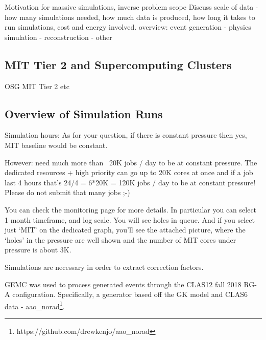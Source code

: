 Motivation for massive simulations, inverse problem scope
    Discuss scale of data - how many simulations needed, how much data is produced, how long it takes to run simulations, cost and energy involved.
    overview: event generation - physics simulation - reconstruction - other
    \subsection{MIT Tier 2 and Supercomputing Clusters}
        OSG MIT Tier 2 etc
    \subsection{Overview of Simulation Runs}

    Simulation hours: 
    As for your question, if there is constant pressure then yes, MIT baseline would be constant.

However: need much more than ~20K jobs / day to be at constant pressure. The dedicated resources + high priority can go up to 20K cores at once and if a job last 4 hours that’s 24/4 = 6*20K = 120K jobs / day to be at constant pressure! Please do not submit that many jobs ;-)

You can check the monitoring page for more details. In particular you can select 1 month timeframe, and log scale. You will see holes in queue.
And if you select just ‘MIT’ on the dedicated graph, you’ll see the attached picture, where the ‘holes’ in the pressure are well shown and the number of MIT cores under pressure is about 3K.

 Simulations are necessary in order to extract correction factors.
    
    GEMC was used to process generated events through the CLAS12 fall 2018 RG-A configuration. Specifically, a generator based off the GK model and CLAS6 data - aao\_norad\footnote{https://github.com/drewkenjo/aao\_norad}. 

